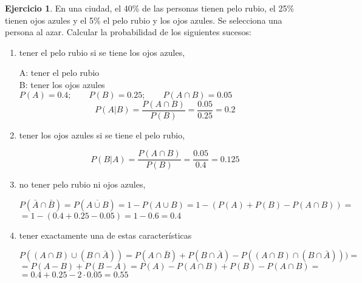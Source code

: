 \documentclass[a4paper, 12pt]{article}
\theoremstyle{definition}
\newtheorem{ej}{Ejercicio}
\begin{document}
\medskip

\begin{ej}
En una ciudad, el 40\% de las personas tienen pelo rubio, el 25\% tienen ojos azules y el 5\% el
pelo rubio y los ojos azules. Se selecciona una persona al azar. Calcular la probabilidad de los
siguientes sucesos:

\begin{enumerate}[label=\textit{\alph*)}]
\item tener el pelo rubio si se tiene los ojos azules,

\medskip

A: tener el pelo rubio \\
B: tener los ojos azules \\
$P(A) = 0.4; \qquad P(B)= 0.25;\qquad P(A\cap B) = 0.05$
\[P(A|B) = \frac{P(A\cap B)}{P(B)} = \frac{0.05}{0.25} = 0.2\]
\item tener los ojos azules si se tiene el pelo rubio,

\[P(B|A) = \frac{P(A\cap B)}{P(B)} = \frac{0.05}{0.4} = 0.125\]

\item no tener pelo rubio ni ojos azules,
\begin{center}
$P(\bar{A} \cap \bar{B}) = P(\overline{ A\cup B}) = 1 - P(A\cup B) = 1- (P(A)+P(B)-P(A\cap B)) =$ \\ $= 1- (0.4 + 0.25 -0.05) = 1 - 0.6 = 0.4$
\end{center}

\item tener exactamente una de estas características

\medskip
\begin{center}
$P((A\cap B)\cup (B \cap \bar{A})) = P(A\cap\bar{B})+P(B\cap\bar{A})-P((A\cap B)\cap (B \cap \bar{A})))=$\\
$=P(A-B)+P(B-A)=P(A)-P(A\cap B) +P(B) - P(A \cap B) =$\\$= 0.4 +0.25 -2\cdot 0.05 = 0.55$
\end{center}
\end{enumerate}

\end{ej}

\medskip
\end{document}
